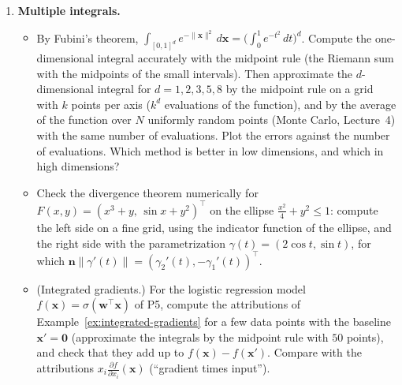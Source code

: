\documentclass[11pt]{article}
\newcommand{\norm}[1]{\lVert #1 \rVert}
\theoremstyle{definition}
\theoremstyle{plain}
\theoremstyle{remark}
\begin{document}
\begin{enumerate}[label=\textbf{P\arabic*.}, leftmargin=*]
    \item \textbf{Multiple integrals.}
    \begin{itemize}
        \item By Fubini's theorem, $\int_{[0, 1]^d} e^{-\norm{\mathbf{x}}^2}\, d\mathbf{x} = \big(\int_0^1 e^{-t^2}\, dt\big)^d$. Compute the one-dimensional integral accurately with the midpoint rule (the Riemann sum with the midpoints of the small intervals). Then approximate the $d$-dimensional integral for $d = 1, 2, 3, 5, 8$ by the midpoint rule on a grid with $k$ points per axis ($k^d$ evaluations of the function), and by the average of the function over $N$ uniformly random points (Monte Carlo, Lecture~4) with the same number of evaluations. Plot the errors against the number of evaluations. Which method is better in low dimensions, and which in high dimensions?
        \item Check the divergence theorem numerically for $F(x, y) = (x^3 + y, \, \sin x + y^2)^\top$ on the ellipse $\frac{x^2}{4} + y^2 \leq 1$: compute the left side on a fine grid, using the indicator function of the ellipse, and the right side with the parametrization $\gamma(t) = (2\cos t, \sin t)$, for which $\mathbf{n}\norm{\gamma'(t)} = (\gamma_2'(t), -\gamma_1'(t))^\top$.
        \item (Integrated gradients.) For the logistic regression model $f(\mathbf{x}) = \sigma(\mathbf{w}^\top\mathbf{x})$ of P5, compute the attributions of Example~\ref{ex:integrated-gradients} for a few data points with the baseline $\mathbf{x}' = \mathbf{0}$ (approximate the integrals by the midpoint rule with $50$ points), and check that they add up to $f(\mathbf{x}) - f(\mathbf{x}')$. Compare with the attributions $x_i\frac{\partial f}{\partial x_i}(\mathbf{x})$ (``gradient times input'').
    \end{itemize}


\end{enumerate}
\end{document}
